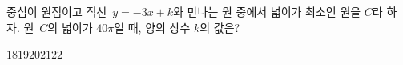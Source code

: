 중심이 원점이고 직선~$y=-3x+k$와 만나는 원 중에서 넓이가 최소인 원을 $C$라 하자. 원~$C$의 넓이가 $40\pi$일 때, 양의 상수 $k$의 값은?
\begin{choices32}{$18$}{$19$}{$20$}{$21$}{$22$}\end{choices32}

